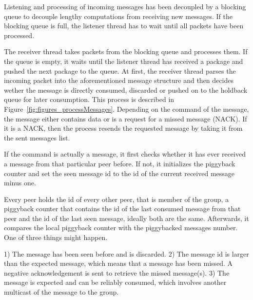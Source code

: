 Listening and processing of incoming messages has been decoupled by a blocking queue to decouple lengthy computations from receiving new messages. If the blocking queue is full, the listener thread has to wait until all packets have been processed. 

The receiver thread takes packets from the blocking queue and processes them. If the queue is empty, it waits until the listener thread has received a package and pushed the next package to the queue. 
At first, the receiver thread parses the incoming packet into the aforementioned message structure and then decides wether the message is directly consumed, discarded or pushed on to the holdback queue for later consumption. This process is described in Figure~\ref{fig:figures_processMessages}.
Depending on the command of the message, the message either contains data or is a request for a missed message (NACK). If it is a NACK,  then the process resends the requested message by taking it from the sent messages list.

If the command is actually a message, it first checks whether it has ever received a message from that particular peer before. If not, it initializes the piggyback counter and set the seen message id to the id of the current received message minus one.

Every peer holds the id of every other peer, that is member of the group, a piggyback counter that contains the id of the last consumed message from that peer and the id of the last seen message, ideally both are the same.
Afterwards, it compares the local piggyback counter with the piggybacked messages number. One of three things might happen. 

1) The message has been seen before and is discarded.
2) The message id is larger than the expected message, which means that a message has been missed. A negative acknowledgement is sent to retrieve the missed message(s). 
3) The message is expected and can be reliably consumed, which involves another multicast of the message to the group.
 
